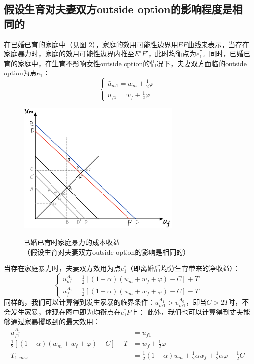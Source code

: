 \documentclass[a4paper,zihao=-4,UTF8]{ctexart}
\begin{document}
	\subsection*{假设生育对夫妻双方outside option的影响程度是相同的}
	在已婚已育的家庭中（见图 2），家庭的效用可能性边界用$EF$曲线来表示，当存在家庭暴力时，家庭的效用可能性边界内推至$E'F'$，此时均衡点为$e^{''}_1$。同时，已婚已育的家庭中，在生育不影响女性outside option的情况下，夫妻双方面临的outside option为点$e_1$：
	\begin{equation}
	\left\{
	\begin{array}{lr}
		\bar{u}_{m1} = w_m +\frac{1}{2} \varphi \\
		\bar{u}_{f1 }= w_f+\frac{1}{2} \varphi 
	\end{array}
	\right.
	\end{equation}
	\begin{figure}[H]
		\centering
		\includegraphics[width=80mm]{pic/figure2.png}
		\caption{\centering}{已婚已育时家庭暴力的成本收益\\（假设生育对夫妻双方outside option的影响是相同的）}
	\end{figure}
	当存在家庭暴力时，夫妻双方效用为点$e^{''}_1$（即离婚后均分生育带来的净收益）：
	\begin{equation}
	\left\{
	\begin{array}{lr}
		u_m^{A_1} = \frac{1}{2}[(1+\alpha)(w_m+w_f+\varphi)-C]+T \\
		u_f^{A_1} =  \frac{1}{2}[(1+\alpha)(w_m+w_f+\varphi)-C]-T 
	\end{array}
	\right.
\end{equation}
	同样的，我们可以计算得到发生家暴的临界条件：$u_{m1}^{A_1}>u_{m1}^{A_0}$，即当$C>2T$时，不会发生家暴，体现在图中即为均衡点在$e^{''}_1P$上：
	此外，我们也可以计算得到丈夫能够通过家暴攫取到的最大效用：
	\begin{equation}
	\begin{aligned}
		u_{f1}^{A_1}  &=	\bar{u}_{f1}  \\
		\frac{1}{2}[(1+\alpha)(w_m+w_f+\varphi)-C]-T &= w_f+\frac{1}{2}\varphi \\
		T_{1,max}&=\frac{1}{2}(1+\alpha)w_m+\frac{1}{2}\alpha w_f+\frac{1}{2}\alpha \varphi-\frac{1}{2}C
	\end{aligned}
\end{equation}
\end{document}
